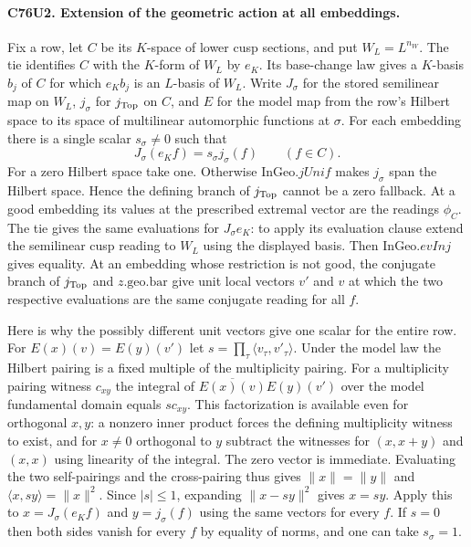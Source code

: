 \paragraph{C76U2. Extension of the geometric action at all embeddings.}
Fix a row, let $C$ be its $K$-space of lower cusp sections, and put
$W_L=L^{n_W}$. The tie identifies $C$ with the $K$-form of $W_L$
by $e_K$. Its base-change law gives a $K$-basis $b_j$ of $C$ for
which $e_K b_j$ is an $L$-basis of $W_L$. Write $J_\sigma$ for the
stored semilinear map on $W_L$, $j_\sigma$ for $j_{\rm Top}$ on
$C$, and $E$ for the model map from the row's Hilbert space to its
space of multilinear automorphic functions at $\sigma$.
For each embedding there is a single scalar $s_\sigma\ne0$ such that
\[
 J_\sigma(e_K f)=s_\sigma j_\sigma(f)\qquad(f\in C).
\]
For a zero Hilbert space take one. Otherwise $\mathrm{InGeo}.jUnif$
makes $j_\sigma$ span the Hilbert space. Hence the defining branch of
$j_{\rm Top}$ cannot be a zero fallback. At a good embedding its
values at the prescribed extremal vector are the readings $\phi_C$.
The tie gives the same evaluations for $J_\sigma e_K$: to apply its
evaluation clause extend the semilinear cusp reading to $W_L$ using
the displayed basis. Then $\mathrm{InGeo}.evInj$ gives equality.
At an embedding whose restriction is not good, the conjugate branch
of $j_{\rm Top}$ and $z.\mathrm{geo.bar}$ give unit local vectors
$v'$ and $v$ at which the two respective evaluations are the same
conjugate reading for all $f$.

Here is why the possibly different unit vectors give one scalar for
the entire row. For $E(x)(v)=E(y)(v')$ let
$s=\prod_\tau\langle v_\tau,v'_\tau\rangle$. Under the model law
the Hilbert pairing is a fixed multiple of the multiplicity pairing.
For a multiplicity pairing witness $c_{xy}$ the integral of
$\overline{E(x)(v)}E(y)(v')$ over the model fundamental domain
equals $s c_{xy}$. This factorization is available even
for orthogonal $x,y$: a nonzero inner product forces the defining
multiplicity witness to exist, and for $x\ne0$ orthogonal to $y$
subtract the witnesses for $(x,x+y)$ and $(x,x)$ using linearity
of the integral. The zero vector is immediate. Evaluating the two
self-pairings and the cross-pairing thus gives
$\|x\|=\|y\|$ and $\langle x,s y\rangle=\|x\|^2$. Since
$|s|\le1$, expanding $\|x-sy\|^2$ gives $x=sy$. Apply this to
$x=J_\sigma(e_K f)$ and $y=j_\sigma(f)$ using the same vectors for
every $f$. If $s=0$ then both sides vanish for every $f$ by equality
of norms, and one can take $s_\sigma=1$.

